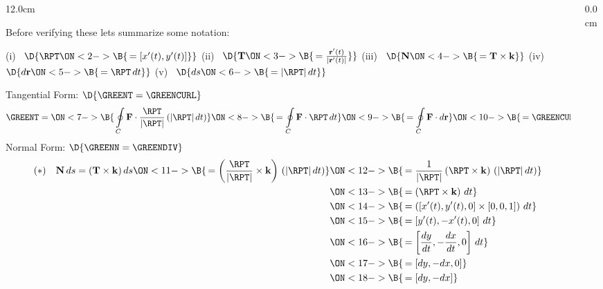 \begin{frame}
\begin{columns}\begin{column}{12.0cm}

\scriptsize
Before verifying these lets summarize some notation:

\vspace{0.2cm}

(i) \, $\D{\RPT 
\ON<2->{\B{\, = [x'(t),y'(t)]}}}$ \quad
(ii) \,  $\D{{\bf T} 
\ON<3->{\B{\, = \frac{{\bf r}'(t)}{|{\bf r}'(t)|}}}}$  \quad
(iii) \, $\D{{\bf N} 
\ON<4->{\B{\, ={\bf T} \times {\bf k}}}}$  \quad
(iv) \, $\D{d{\bf r} 
\ON<5->{\B{\,= \RPT \, dt}}}$  \quad
(v) \, $\D{ds 
\ON<6->{\B{\,= |\RPT| \, dt}}}$

\vspace{0.2cm}

Tangential Form: \quad $\D{\GREENT = \GREENCURL }$
\begin{align*}
	\GREENT = 
	\ON<7->{\B{\, \oint \limits_{C} {\bf F} \cdot \frac{\RPT}{|\RPT|}\, (|\RPT|\,dt)}}
	\ON<8->{\B{\,= \oint \limits_{C} {\bf F} \cdot \RPT\,dt}}
	\ON<9->{\B{\,= \oint \limits_{C} {\bf F} \cdot d{\bf r}}}
	\ON<10->{\B{\,= \GREENCURL \quad \checkmark}}
\end{align*}
Normal Form: \quad $\D{\GREENN = \GREENDIV}$
\begin{align*}
	(*)\quad{\bf N}\,ds = ({\bf T} \times {\bf k})\, ds
\ON<11->{\B{ \,= \left(\frac{\RPT}{|\RPT|} \times {\bf k}\right)\, (|\RPT|\,dt)}}
&\ON<12->{\B{\,= \frac{1}{|\RPT|}\left(\RPT \times {\bf k}\right)\, (|\RPT|\,dt)}}\\
&\ON<13->{\B{ \,= \left(\RPT \times {\bf k}\right)\,dt}}\\
&\ON<14->{\B{ \,= \left([x'(t),y'(t),0] \times [0,0,1]\right)\, dt}}\\
&\ON<15->{\B{ \,= \left[y'(t),-x'(t),0\right]\, dt}}\\
&\ON<16->{\B{ \,= \left[\frac{dy}{dt},-\frac{dx}{dt},0\right]\, dt}}\\
&\ON<17->{\B{ \,= [dy,-dx,0]}}\\
&\ON<18->{\B{ \,= [dy,-dx]}}
\end{align*}
\end{column}\begin{column}{0.0cm}\end{column}\end{columns}
\end{frame}

